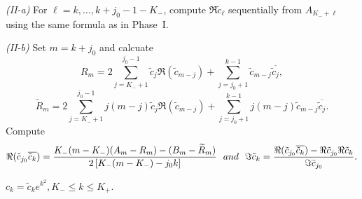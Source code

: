 \documentclass[11pt,oneside,reqno]{amsart}
\numberwithin{equation}{section}
\begin{document}
\begin{algorithm}[htp!]
\begin{algorithmic}
\State \emph{(II-a)} For $\ell=k,\ldots,k+j_0-1-K_-$, compute $\Re\tilde c_\ell$ sequentially from $A_{K_-+\ell}$ using the same formula as in Phase~I.

\State \emph{(II-b)} Set $m=k+j_0$ and calcuate 
\[
R_m=
2\sum_{j=K_-+1}^{j_0-1}\tilde c_j\Re(\tilde c_{m-j})
+\sum_{j=j_0+1}^{k-1}\tilde c_{m-j}\overline{\tilde c_j},
\]
\[
\widetilde R_m=
2\sum_{j=K_-+1}^{j_0-1}j(m-j)\tilde c_j\Re(\tilde c_{m-j})
+\sum_{j=j_0+1}^{k-1}j(m-j)\tilde c_{m-j}\overline{\tilde c_j}.
\]
Compute
\[
\Re(\tilde c_{j_0}\overline{\tilde c_k})
=
\frac{K_-(m-K_-)(A_m-R_m)-(B_m-\widetilde R_m)}
     {2\,[K_-(m-K_-)-j_0k]} \ \ {\rm and} \  \
\Im\tilde c_k
=
\frac{\Re(\tilde c_{j_0}\overline{\tilde c_k})
-\Re\tilde c_{j_0}\Re\tilde c_k}{\Im\tilde c_{j_0}}. 
\]

\EndFor
\EndIf

  $ c_k=\tilde c_ke^{k^2}, K_-\le k\le K_+$.
\end{algorithmic}
\end{algorithm}


\end{document}
